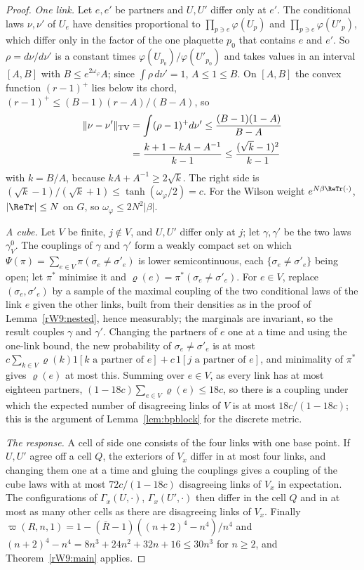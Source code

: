 \begin{proof}
\emph{One link.} Let $e,e'$ be partners and $U,U'$ differ only at $e'$. The
conditional laws $\nu,\nu'$ of $U_e$ have densities proportional to $\prod_{p
\ni e}\varphi(U_p)$ and $\prod_{p\ni e}\varphi(U'_p)$, which differ only in
the factor of the one plaquette $p_0$ that contains $e$ and $e'$. So $\rho=d
\nu/d\nu'$ is a constant times $\varphi(U_{p_0})/\varphi(U'_{p_0})$ and takes
values in an interval $[A,B]$ with $B\le e^{2\omega_\varphi}A$; since $\int
\rho\,d\nu'=1$, $A\le1\le B$. On $[A,B]$ the convex function $(r-1)^+$ lies
below its chord, $(r-1)^+\le(B-1)(r-A)/(B-A)$, so
\[
\begin{split}
\lVert\nu-\nu'\rVert_{\rm TV}&=\int(\rho-1)^+d\nu'\le\frac{(B-1)(1-A)}{B-A}
\\
&=\frac{k+1-kA-A^{-1}}{k-1}\le\frac{(\sqrt k-1)^2}{k-1}
\end{split}
\]
with $k=B/A$, because $kA+A^{-1}\ge2\sqrt k$. The right side is $(\sqrt k-1)/(
\sqrt k+1)\le\tanh(\omega_\varphi/2)=c$. For the Wilson weight
$e^{N\beta\ReTr(\cdot)}$, $\lvert\ReTr\rvert\le N$ on $G$, so
$\omega_\varphi\le2N^2\lvert\beta\rvert$.

\emph{A cube.} Let $V$ be finite, $j\notin V$, and $U,U'$ differ only at $j$;
let $\gamma,\gamma'$ be the two laws $\gamma^0_V$. The couplings of $\gamma$
and $\gamma'$ form a weakly compact set on which $\Psi(\pi)=\sum_{e\in V}\pi(
\sigma_e\ne\sigma'_e)$ is lower semicontinuous, each $\{\sigma_e\ne\sigma'_e\}$
being open; let $\pi^*$ minimise it and $\varrho(e)=\pi^*(\sigma_e\ne
\sigma'_e)$. For $e\in V$, replace $(\sigma_e,\sigma'_e)$ by a sample of the
maximal coupling of the two conditional laws of the link $e$ given the
other links, built from their densities as in the proof of
Lemma~\ref{rW9:nested}, hence measurably; the marginals are invariant, so the
result couples $\gamma$ and $\gamma'$. Changing the partners of $e$ one at a
time and using the one-link bound, the new probability of $\sigma_e\ne
\sigma'_e$ is at most $c\sum_{k\in V}\varrho(k)1[k\text{ a partner of }e]+c\,
1[j\text{ a partner of }e]$, and minimality of $\pi^*$ gives $\varrho(e)$ at
most this. Summing over $e\in V$, as every link has at most eighteen partners,
$(1-18c)\sum_{e\in V}\varrho(e)\le18c$, so there is a coupling under which
the expected number of disagreeing links of $V$ is at most $18c/(1-18c)$; this
is the argument of Lemma~\ref{lem:bpblock} for the discrete metric.

\emph{The response.} A cell of side one consists of the four links with one
base point. If $U,U'$ agree off a cell $Q$, the exteriors of $V_x$ differ in
at most four links, and changing them one at a time and gluing the couplings
gives a coupling of the cube laws with at most $72c/(1-18c)$ disagreeing links
of $V_x$ in expectation. The configurations of $\Gamma_x(U,\cdot)$,
$\Gamma_x(U',\cdot)$ then differ in the cell $Q$ and in at most as many other
cells as there are disagreeing links of $V_x$. Finally $\varpi(R,n,1)=1-(\bar
R-1)((n+2)^4-n^4)/n^4$ and $(n+2)^4-n^4=8n^3+24n^2+32n+16\le30n^3$ for $n\ge
2$, and Theorem~\ref{rW9:main} applies.
\end{proof}

